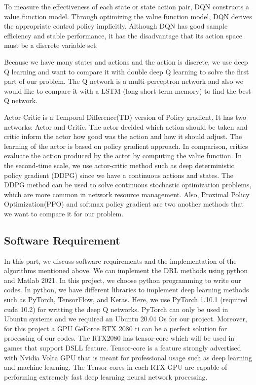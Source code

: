 \documentclass{article}
\begin{document}
\newpage
To measure the effectiveness of each state or state action pair, DQN constructs a value function model. Through optimizing the value function model, DQN derives the appropriate control policy implicitly. Although DQN has good sample efficiency and stable performance, it has the disadvantage that its action space must be a discrete variable set. 

Because we have many states and actions and the action is discrete, we use deep Q learning and want to compare it with double deep Q learning to solve the first part of our problem. The Q network is a multi-perceptron network and also we would like to compare it with a LSTM (long short term memory) to find the best Q network. 

Actor-Critic is a Temporal Difference(TD) version of Policy gradient. It has two networks: Actor and Critic. The actor decided which action should be taken and critic inform the actor how good was the action and how it should adjust. The learning of the actor is based on policy gradient approach. In comparison, critics evaluate the action produced by the actor by computing the value function. 
In the second-time scale, we use actor-critic method such as deep deterministic policy gradient (DDPG) since we have a continuous actions and states.
The DDPG method can be used to solve continuous stochastic optimization problems, which are more common in network resource management. Also, Proximal Policy Optimization(PPO) and softmax policy gradient are two another methods that we want to compare it for our problem. 
\subsection{Software Requirement}
In this part, we discuss software requirements and the implementation of the algorithms mentioned above. 
We can implement the DRL methods using python and Matlab 2021. In this project, we choose python programming to write our codes. In python, we have different libraries to implement deep learning methods such as PyTorch, TensorFlow, and Keras. Here, we use PyTorch 1.10.1 (required cuda 10.2) for writting the deep Q networks. PyTorch can only be used in Ubuntu systems and we required an Ubuntu 20.04 Os for our project. 
Moreover, for this project a GPU GeForce RTX 2080 ti can be a perfect solution for processing of our codes. 
The RTX2080 has tensor-core which will be used in games that support DSLL feature. Tensor-core is a feature strongly advertised with Nvidia Volta GPU that is meant for professional usage such as deep learning and machine learning.
The Tensor cores in each RTX GPU are capable of performing extremely fast deep learning neural network processing.
\end{document}
